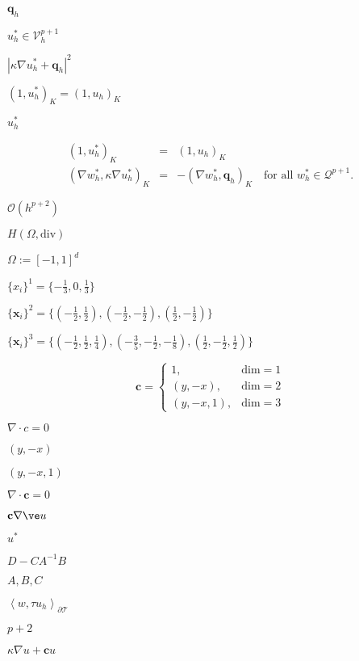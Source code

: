 \documentclass{article}
\begin{document}
$\mathbf{q}_h$
\pagebreak

$u_h^* \in \mathcal{V}_h^{p+1}$
\pagebreak

$|\kappa \nabla u_h^* + \mathbf{q}_h|^2$
\pagebreak

$\left(1, u_h^*\right)_K = \left(1, u_h\right)_K$
\pagebreak

$u_h^*$
\pagebreak

\begin{eqnarray*} \left(1, u_h^*\right)_K &=& \left(1, u_h\right)_K\\ \left(\nabla w_h^*, \kappa \nabla u_h^*\right)_K &=& -\left(\nabla w_h^*, \mathbf{q}_h\right)_K \quad \text{for all } w_h^* \in \mathcal Q^{p+1}. \end{eqnarray*}
\pagebreak

$\mathcal {O}(h^{p+2})$
\pagebreak

$H(\Omega,\mathrm{div})$
\pagebreak

$\Omega := [-1,1]^d$
\pagebreak

$\{x_i\}^1 = \{ -\frac{1}{3}, 0, \frac{1}{3} \}$
\pagebreak

$\{\mathbf{x}_i\}^2 = \{ (-\frac{1}{2},\frac{1}{2}), (-\frac{1}{2},-\frac{1}{2}), (\frac{1}{2},-\frac{1}{2}) \}$
\pagebreak

$\{\mathbf{x}_i\}^3 = \{ (-\frac{1}{2},\frac{1}{2}, \frac{1}{4}), (-\frac{3}{5},-\frac{1}{2}, -\frac{1}{8}), (\frac{1}{2},-\frac{1}{2}, \frac{1}{2}) \}$
\pagebreak

\[ \mathbf{c} = \begin{cases} 1, & \textrm{dim}=1 \\ (y, -x), & \textrm{dim}=2 \\ (y, -x, 1), & \textrm{dim}=3 \end{cases} \]
\pagebreak

$\nabla \cdot c = 0$
\pagebreak

$(y, -x)$
\pagebreak

$(y, -x, 1)$
\pagebreak

$\nabla \cdot \mathbf{c} = 0$
\pagebreak

$\mathbf{c} \nabla \ve u$
\pagebreak

$u^*$
\pagebreak

$D-CA^{-1}B$
\pagebreak

$A, B, C$
\pagebreak

$\left<w,\tau u_h\right>_{\partial \mathcal T}$
\pagebreak

$p+2$
\pagebreak

$\kappa \nabla u + \mathbf{c} u$
\pagebreak
\end{document}
